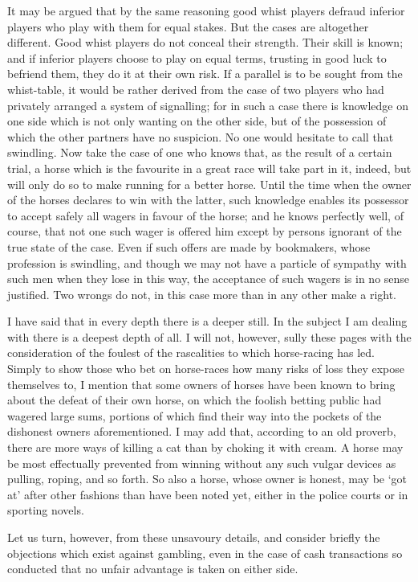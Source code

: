 \documentclass[letterpaper,12pt,oneside,openany]{memoir}
\begin{document}
It may be argued that by the same reasoning good
whist players defraud inferior players who play with
them for equal stakes. But the cases are altogether
different. Good whist players do not conceal their
strength. Their skill is known; and if inferior players
choose to play on equal terms, trusting in good luck to
befriend them, they do it at their own risk. If a
parallel is to be sought from the whist-table, it would
be rather derived from the case of two players who
had privately arranged a system of signalling; for in
such a case there is knowledge on one side which is not
only wanting on the other side, but of the possession of
which the other partners have no suspicion. No one would
hesitate to call that swindling. Now take the case of
one who knows that, as the result of a certain trial, a
horse which is the favourite in a great race will take
part in it, indeed, but will only do so to make running
for a better horse. Until the time when the owner of
the horses declares to win with the latter, such knowledge
enables its possessor to accept safely all wagers in
favour of the horse; and he knows perfectly well, of
course, that not one such wager is offered him except
by persons ignorant of the true state of the case. Even
if such offers are made by bookmakers, whose profession
is swindling, and though we may not have a particle of
sympathy with such men when they lose in this way,
the acceptance of such wagers is in no sense justified.
Two wrongs do not, in this case more than in any other
make a right.

I have said that in every depth there is a deeper
still. In the subject I am dealing with there is a deepest
depth of all. I will not, however, sully these pages
with the consideration of the foulest of the rascalities
to which horse-racing has led. Simply to show those
who bet on horse-races how many risks of loss they expose
themselves to, I mention that some owners of horses
have been known to bring about the defeat of their own
horse, on which the foolish betting public had wagered
large sums, portions of which find their way into the
pockets of the dishonest owners aforementioned. I
may add that, according to an old proverb, there are
more ways of killing a cat than by choking it with
cream. A horse may be most effectually prevented from
winning without any such vulgar devices as pulling,
roping, and so forth. So also a horse, whose owner is
honest, may be `got at' after other fashions than have
been noted yet, either in the police courts or in sporting
novels.

Let us turn, however, from these unsavoury details,
and consider briefly the objections which exist against
gambling, even in the case of cash transactions so conducted
that no unfair advantage is taken on either
side.
\end{document}
